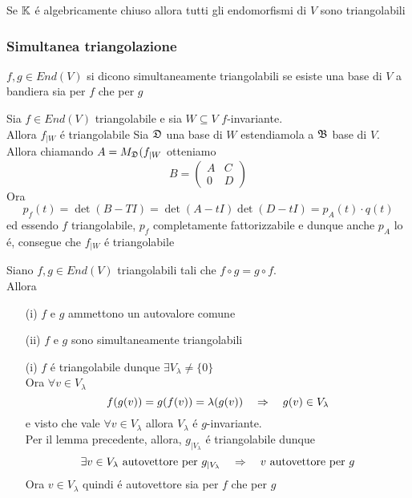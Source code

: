 \begin{cor}Se $\mathbb{K}$ \'e algebricamente chiuso allora tutti gli endomorfismi di $V$ sono triangolabili
\end{cor}
\newpage
\subsubsection{Simultanea triangolazione}
\begin{defn}$f,g\in End(V)$ si dicono simultaneamente triangolabili se esiste una base di $V$ a bandiera sia per $f$ che per $g$
\end{defn}
\spazio 
\begin{lem}Sia $f\in End(V)$ triangolabile e sia $W\subseteq V $ $f$-invariante.\\
Allora $f_{\vert W } $ \'e triangolabile
\proof Sia $\mathfrak{D}$ una base di $W$ estendiamola a $\mathfrak{B}$ base di $V$.\\
Allora chiamando $A=M_{\mathfrak{D}}(f_{\vert W } $ otteniamo
$$ B = \left( \begin{array}{c|c} 
A & C \\
\hline 
0 & D 
\end{array} \right)$$
Ora $$p_f(t) = \det ( B - TI)= \det (A-tI) \det ( D-tI) = p_A(t) \cdot q(t) $$
ed essendo $f$ triangolabile, $p_f$ completamente fattorizzabile e dunque anche $p_A$ lo \'e, consegue che $f_{\vert W } $ \'e triangolabile
\end{lem}
\begin{prop}Siano $f,g \in End(V) $ triangolabili tali che $f\circ g = g \circ f $.\\
Allora
\begin{itemize}
\item[(i)] $f$ e $g$ ammettono un autovalore comune
\item[(ii)]$f$ e $g$ sono simultaneamente triangolabili

\end{itemize}
\proof \bianco
\begin{itemize}
\item[(i)] $f$ \'e triangolabile dunque $\exists V_\lambda \neq \{ 0 \} $\\
Ora $\forall v \in V_\lambda $ 
$$ f( g(v)) = g(f(v))= \lambda (g(v)) \quad \Rightarrow \quad g(v) \in V_\lambda $$
e visto che vale $\forall v \in V_\lambda $ allora $V_\lambda $ \'e $g$-invariante.\\
Per il lemma precedente, allora, $ g_{\vert V_\lambda } $ \'e triangolabile dunque 
$$ \exists v \in V_\lambda \text{ autovettore per } g_{\vert V_\lambda} \quad \Rightarrow \quad v \text{ autovettore per } g $$
Ora $v\in V_\lambda$ quindi \'e autovettore sia per $f$ che per $g$ 
\end{itemize}
\end{prop}
\newpage
